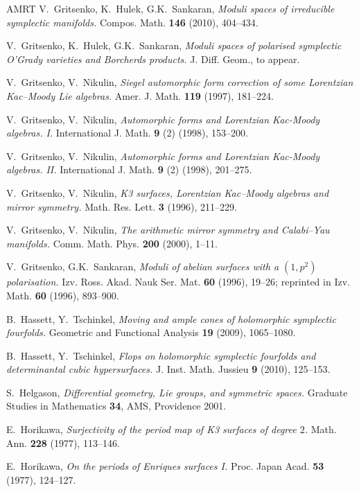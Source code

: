 \documentclass[a4paper,11pt]{article}
\begin{document}
\begin{thebibliography}{AMRT}
 V.~Gritsenko, K.~Hulek, G.K.~Sankaran,
  \emph{Moduli spaces of irreducible symplectic manifolds.}
  Compos. Math. {\bf 146} (2010), 404--434.

 V.~Gritsenko, K.~Hulek, G.K.~Sankaran,
  \emph{Moduli spaces of polarised symplectic O'Grady varieties and
    Borcherds products.}  J. Diff. Geom., to appear.

 V.~Gritsenko, V.~Nikulin, \emph{Siegel automorphic form
  correction of some Lorentzi\-an Kac--Moody Lie algebras.}
  Amer. J. Math. {\bf 119} (1997), 181--224.

 V.~Gritsenko, V.~Nikulin, {\it Automorphic forms
  and Lorentzian Kac-Moody algebras.  I.} International J. Math. {\bf
  9} (2) (1998), 153--200.

 V.~Gritsenko, V.~Nikulin, {\it Automorphic forms
  and Lorentzian Kac-Moody algebras.  II.} International J. Math. {\bf
  9} (2) (1998), 201--275.

 V.~Gritsenko, V.~Nikulin, {\it K3 surfaces,
  Lorentzian Kac--Moody algebras and mirror symmetry.}
  Math. Res. Lett. {\bf 3} (1996), 211--229.

 V.~Gritsenko, V.~Nikulin, {\it The arithmetic
  mirror symmetry and Calabi--Yau manifolds.}  Comm. Math. Phys. {\bf
  200} (2000), 1--11.

 V.~Gritsenko, G.K.~Sankaran, {\it Moduli of abelian
  surfaces with a $(1,p^2)$ polarisation.} Izv. Ross. Akad. Nauk
  Ser. Mat. {\bf 60} (1996), 19--26; reprinted in Izv. Math.  {\bf 60}
  (1996), 893--900.

 B.~Hassett, Y.~Tschinkel, {\it Moving and ample
  cones of holomorphic symplectic fourfolds.} Geometric and Functional
  Analysis {\bf 19} (2009), 1065--1080.

 B.~Hassett, Y.~Tschinkel, {\it Flops on holomorphic
  symplectic fourfolds and determinantal cubic hypersurfaces.}
  J. Inst. Math. Jussieu {\bf 9} (2010), 125--153.

 S.~Helgason, {\it Differential geometry, Lie
  groups, and symmetric spaces.} Graduate Studies in Mathematics {\bf
  34}, AMS, Providence 2001.

 E.~Horikawa, {\it Surjectivity of the period map of
  K3 surfaces of degree $2$.}  Math. Ann. {\bf 228} (1977),
  113--146.

 E.~Horikawa, {\it On the periods of Enriques surfaces I.}
Proc. Japan Acad. {\bf 53} (1977), 124--127. 


\end{thebibliography}
\end{document}
